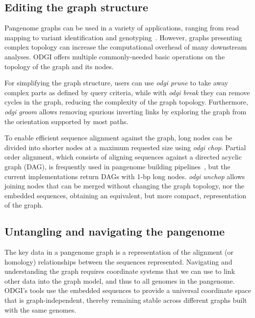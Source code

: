 \documentclass{bioinfo}
\begin{document}
\subsection{Editing the graph structure}
\label{sec:edit}

Pangenome graphs can be used in a variety of applications, ranging from read mapping to variant identification and genotyping~\citep{Eizenga_2020}.
However, graphs presenting complex topology can increase the computational overhead of many downstream analyses.
ODGI offers multiple commonly-needed basic operations on the topology of the graph and its nodes.

For simplifying the graph structure, users can use \textit{odgi prune} to take away complex parts as defined by query criteria,
while with \textit{odgi break} they can remove cycles in the graph, reducing the complexity of the graph topology.
Furthermore, \textit{odgi groom} allows removing spurious inverting links by exploring the graph from the orientation supported by most paths.

To enable efficient sequence alignment against the graph, long nodes can be divided into shorter nodes at a maximum requested size using \textit{odgi chop}.
Partial order alignment, which consists of aligning sequences against a directed acyclic graph (DAG), is frequently used in pangenome building pipelines~\citep{pggb}, but the current implementations return DAGs with 1-bp long nodes.
\textit{odgi unchop} allows joining nodes that can be merged without changing the graph topology, nor the embedded sequences, obtaining an equivalent, but more compact, representation of the graph.


\subsection{Untangling and navigating the pangenome}
\label{sec:untangle}


The key data in a pangenome graph is a representation of the alignment (or homology) relationships between the sequences represented.
Navigating and understanding the graph requires coordinate systems that we can use to link other data into the graph model, and thus to all genomes in the pangenome.
ODGI's tools use the embedded sequences to provide a universal coordinate space that is graph-independent, thereby remaining stable across different graphs built with the same genomes.
\end{document}

